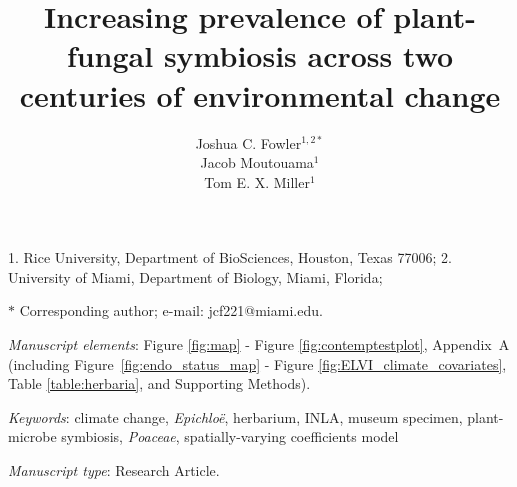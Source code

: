 \documentclass[11pt]{article}
\title{Increasing prevalence of plant-fungal symbiosis across two centuries of environmental change}
\author{Joshua C. Fowler$^{1,2\ast}$ \\
	Jacob Moutouama$^{1}$\\
	Tom E. X. Miller$^{1}$}
\date{}
\begin{document}
	
	\maketitle
	
	\noindent{} 1. Rice University, Department of BioSciences, Houston, Texas 77006;
	\noindent{} 2. University of Miami, Department of Biology, Miami, Florida;


	\noindent{} $\ast$ Corresponding author; e-mail: jcf221@miami.edu.
	
	\bigskip
	
	\textit{Manuscript elements}: Figure \ref{fig:map} - Figure \ref{fig:contemptestplot}, Appendix~A (including Figure~\ref{fig:endo_status_map} - Figure \ref{fig:ELVI_climate_covariates},  Table \ref{table:herbaria}, and Supporting Methods).
	
	\bigskip
	
	\textit{Keywords}: climate change, \emph{Epichloë}, herbarium, INLA, museum specimen, plant-microbe symbiosis, \emph{Poaceae}, spatially-varying coefficients model
	
	\bigskip
	
	\textit{Manuscript type}: Research Article. %
	
	\bigskip

	
	
	\newpage{}
	
\end{document}
